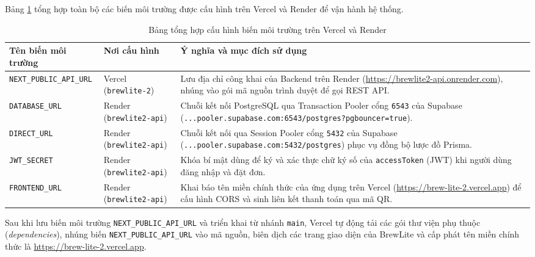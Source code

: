 Bảng \ref{tab:env-summary} tổng hợp toàn bộ các biến môi trường được cấu hình trên Vercel và Render để vận hành hệ thống.

\begin{table}[H]
\centering
\small
\renewcommand{\arraystretch}{1.25}
\caption{Bảng tổng hợp cấu hình biến môi trường trên Vercel và Render}
\vspace{0.2cm}
\begin{tabular}{|p{4.3cm}|p{2.9cm}|p{7.7cm}|}
\hline
\textbf{Tên biến môi trường} & \textbf{Nơi cấu hình} & \textbf{Ý nghĩa và mục đích sử dụng} \\ \hline
\texttt{NEXT\_PUBLIC\_API\_URL} & Vercel \newline (\texttt{brewlite-2}) & Lưu địa chỉ công khai của Backend trên Render (\url{https://brewlite2-api.onrender.com}), nhúng vào gói mã nguồn trình duyệt để gọi REST API. \\ \hline
\texttt{DATABASE\_URL} & Render \newline (\texttt{brewlite2-api}) & Chuỗi kết nối PostgreSQL qua Transaction Pooler cổng \texttt{6543} của Supabase (\texttt{...pooler.supabase.com:6543/postgres?pgbouncer=true}). \\ \hline
\texttt{DIRECT\_URL} & Render \newline (\texttt{brewlite2-api}) & Chuỗi kết nối qua Session Pooler cổng \texttt{5432} của Supabase (\texttt{...pooler.supabase.com:5432/postgres}) phục vụ đồng bộ lược đồ Prisma. \\ \hline
\texttt{JWT\_SECRET} & Render \newline (\texttt{brewlite2-api}) & Khóa bí mật dùng để ký và xác thực chữ ký số của \texttt{accessToken} (JWT) khi người dùng đăng nhập và đặt đơn. \\ \hline
\texttt{FRONTEND\_URL} & Render \newline (\texttt{brewlite2-api}) & Khai báo tên miền chính thức của ứng dụng trên Vercel (\url{https://brew-lite-2.vercel.app}) để cấu hình CORS và sinh liên kết thanh toán qua mã QR. \\ \hline
\end{tabular}
\label{tab:env-summary}
\end{table}

Sau khi lưu biến môi trường \texttt{NEXT\_PUBLIC\_API\_URL} và triển khai từ nhánh \texttt{main}, Vercel tự động tải các gói thư viện phụ thuộc (\textit{dependencies}), nhúng biến \texttt{NEXT\_PUBLIC\_API\_URL} vào mã nguồn, biên dịch các trang giao diện của BrewLite và cấp phát tên miền chính thức là \url{https://brew-lite-2.vercel.app}.

